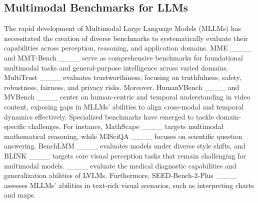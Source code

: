 \subsection{Multimodal Benchmarks for LLMs}
The rapid development of Multimodal Large Language Models (MLLMs) has necessitated the creation of diverse benchmarks to systematically evaluate their capabilities across perception, reasoning, and application domains. MME ____ and MMT-Bench ____ serve as comprehensive benchmarks for foundational multimodal tasks and general-purpose intelligence across varied domains. MultiTrust ____ evaluates trustworthiness, focusing on truthfulness, safety, robustness, fairness, and privacy risks. Moreover, HumanVBench ____ and MVBench ____ center on human-centric and temporal understanding in video content, exposing gaps in MLLMs' abilities to align cross-modal and temporal dynamics effectively. Specialized benchmarks have emerged to tackle domain-specific challenges. For instance, MathScape ____ targets multimodal mathematical reasoning, while M3SciQA ____ focuses on scientific question answering. BenchLMM ____ evaluates models under diverse style shifts, and BLINK ____ targets core visual perception tasks that remain challenging for multimodal models. ____ evaluate the medical diagnostic capabilities and generalization abilities of LVLMs. Furthermore, SEED-Bench-2-Plus ____ assesses MLLMs' abilities in text-rich visual scenarios, such as interpreting charts and maps. 






